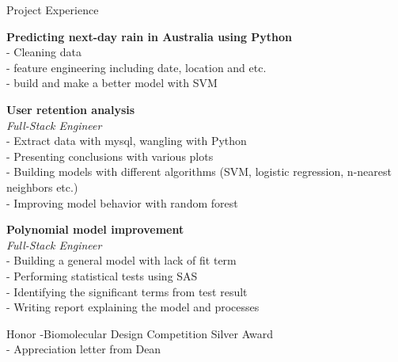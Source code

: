 \documentclass{resume} %
\begin{document}
\begin{rSection}{Project Experience}

{\bf Predicting next-day rain in Australia using Python } 
\\- Cleaning data
\\- feature engineering including date, location and etc.
\\- build and make a better model with SVM

{\bf User retention analysis} \
\\{\textit{Full-Stack Engineer}}
\\- Extract data with mysql, wangling with Python
\\- Presenting conclusions with various plots
\\- Building models with different algorithms (SVM, logistic regression, n-nearest neighbors etc.)
\\- Improving model behavior with random forest

{\bf Polynomial model improvement} \
\\{\textit{Full-Stack Engineer}}
\\- Building a general model with lack of fit term
\\- Performing statistical tests using SAS
\\- Identifying the significant terms from test result
\\- Writing report explaining the model and processes




\end{rSection}
\begin{rSection}{Honor}
-Biomolecular Design Competition Silver Award\\
- Appreciation letter from Dean
\end{rSection}

\end{document}
